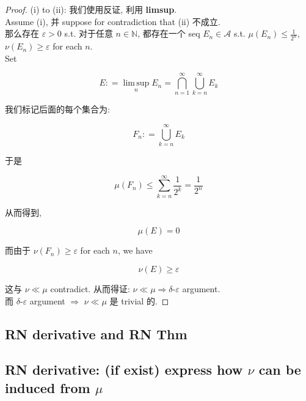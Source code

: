 \begin{proof}

(i) to (ii): 我们使用反证, 利用 \textbf{limsup}.\\
Assume (i), 并 suppose for contradiction that (ii) 不成立.\\
那么存在 \(\varepsilon > 0\) s.t. 对于任意 \(n \in \mathbb{N}\), 都存在一个 seq \(E_{n} \in \mathcal{A}\) s.t. \(\mu(E_{n}) \leq \frac{1}{2^{n}}\), \(\nu(E_{n}) \geq \varepsilon\) for each \(n\).\\
Set

\[E: = \operatorname{lim\, sup}\limits_{n}E_{n} = \bigcap\limits_{n = 1}^{\infty}\bigcup\limits_{k = n}^{\infty}E_{k}\]

我们标记后面的每个集合为:

\[F_{n}: = \bigcup\limits_{k = n}^{\infty}E_{k}\]

于是

\[\mu(F_{n}) \leq \sum\limits_{k = n}^{\infty}\frac{1}{2^{k}} = \frac{1}{2^{n}}\]

从而得到,

\[\mu(E) = 0\]

而由于 \(\nu(F_{n}) \geq \varepsilon\) for each \(n\), we have

\[\nu(E) \geq \varepsilon\]

这与 \(\nu \ll \mu\) contradict. 从而得证: \(\nu \ll \mu\Longrightarrow\delta\)-\(\varepsilon\) argument.\\
而 \(\delta\)-\(\varepsilon\) argument \(\Longrightarrow\) \(\nu \ll \mu\) 是 trivial 的.

\end{proof}

\subsection{RN derivative and RN Thm}\label{rn-derivative-and-rn-thm}

\subsection{\texorpdfstring{RN derivative: (if exist) express how \(\nu\) can be induced from \(\mu\)}{RN derivative: (if exist) express how \textbackslash nu can be induced from \textbackslash mu}}\label{rn-derivative-if-exist-express-how-nu-can-be-induced-from-mu}

